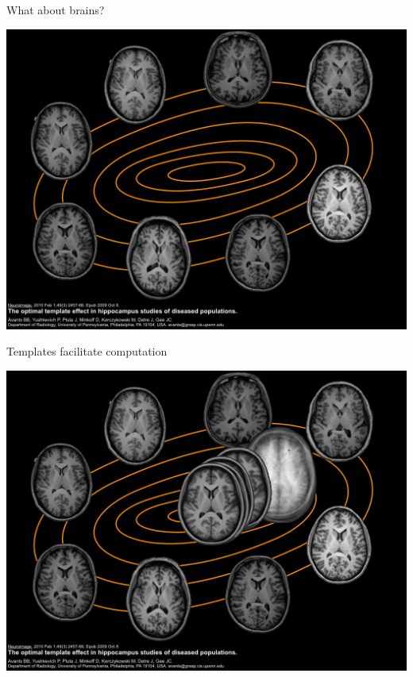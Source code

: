 \documentclass[ignorenonframetext,]{beamer}
\begin{document}
\begin{frame}{What about brains?}

\includegraphics{./papers/figures/template3.jpg}

\end{frame}

\begin{frame}{Templates facilitate computation}

\includegraphics{./papers/figures/template4.jpg}

\end{frame}
\end{document}
